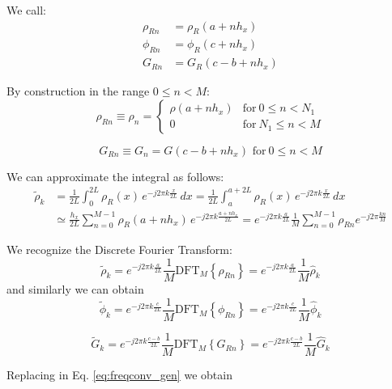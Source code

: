 We call:
\begin{align}
 \rho_{Rn} &= \rho_{R}\left(a + nh_x\right)\\
 \phi_{Rn} &= \phi_{R}\left(c + nh_x\right)\\
 G_{Rn} &= G_{R}\left(c - b + nh_x\right)
\end{align}

By construction in the range $0 \leq n <M$:
\begin{equation}
 \rho_{Rn} \equiv \rho_n = 
 \begin{cases}
\rho\left(a + nh_x\right)&\text{for}~0 \leq n <N_1 \\
 0 & \text{for}~N_1 \leq n < M
 \end{cases}
\end{equation}

\begin{equation}
G_{Rn} \equiv  G_n = G\left(c - b + nh_x\right)
\text{ for}~0 \leq n <M
\end{equation}

We can approximate the integral as follows:
\begin{align}
\tilde{\rho}_k &= \frac{1}{2L}\int_0^{2L} \rho_{R}(x)\, e^{-j2\pi k \frac{x}{2L}} \, dx = \frac{1}{2L}\int_a^{a+2L} \rho_{R}(x)\, e^{-j2\pi k \frac{x}{2L}} \, dx\\
&\simeq 
\frac{h_x}{2L}\sum_{n=0}^{M-1} \rho_{R}(a+nh_x)\, e^{-j2\pi k \frac{a+nh_x}{2L}} 
=
e^{-j2\pi k \frac{a}{2L}} \frac{1}{M}
\sum_{n=0}^{M-1}
 \rho_{Rn} e^{-j2\pi \frac{kn}{M}} 
\end{align}

We recognize the Discrete Fourier Transform:
\begin{equation}
\tilde{\rho}_k 
=
e^{-j2\pi k \frac{a}{2L}} \frac{1}{M}
\text{DFT}_M\left\{ \rho_{Rn}\right\}
=
e^{-j2\pi k \frac{a}{2L}} \frac{1}{M}
\hat{\rho}_k 
\end{equation}
and similarly we can obtain
\begin{equation}
\tilde{\phi}_k 
=
e^{-j2\pi k \frac{c}{2L}} \frac{1}{M}
\text{DFT}_M\left\{ \phi_{Rn}\right\}
=
e^{-j2\pi k \frac{c}{2L}} \frac{1}{M}
\hat{\phi}_k 
\end{equation}

\begin{equation}
\tilde{G}_k 
=
e^{-j2\pi k \frac{c-b}{2L}} \frac{1}{M}
\text{DFT}_M\left\{ G_{Rn}\right\}
=
e^{-j2\pi k \frac{c-b}{2L}} \frac{1}{M}
\hat{G}_k 
\end{equation}


Replacing in Eq. \ref{eq:freqconv_gen} we obtain

